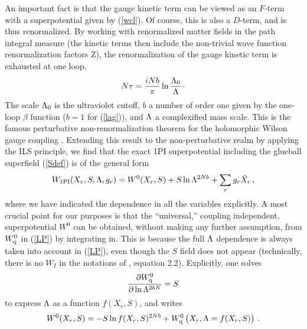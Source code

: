 \documentclass[a4paper,12pt]{article}
\begin{document}
An important fact is that the gauge kinetic term 
can be viewed as an $F$-term with a superpotential given by 
(\ref{wcl}). Of course, this is also a $D$-term, and is thus renormalized. 
By working with renormalized matter fields
in the path integral measure (the kinetic terms then include
the non-trivial wave function renormalization factors Z), the 
renormalization of the gauge kinetic term is exhausted at one loop,
%
\begin{equation}
\label{tauren}
N\tau = {iNb\over\pi}\ln {\Lambda_{0}\over\Lambda}\,\cdotp
\end{equation}
%
The scale $\Lambda_{0}$ is the ultraviolet cutoff, $b$ a number of order
one given by the one-loop $\beta$ function ($b=1$ for (\ref{lag})),
and $\Lambda$ a complexified mass scale. This is the famous perturbative
non-renormalization theorem for the holomorphic Wilson gauge coupling
\cite{SV}. Extending this result to the non-perturbative realm by
applying the ILS principle, we find that the exact 1PI superpotential
including the glueball superfield (\ref{Sdef}) is of the general form
%
\begin{equation}
\label{WeffS}
W_{\rm 1PI} (X_{r},S,\Lambda,g_{r}) = W^{0}(X_{r},S) + S\ln
\Lambda^{2Nb} + \sum_{r}g_{r}\tilde X_{r}\, ,
\end{equation}
%
where we have indicated the dependence in all the variables explicitly. A
most crucial point for our purposes
is that the ``universal,'' coupling independent,
superpotential $W^{0}$ can be obtained, without making any further
assumption, from $W_{\rm q}^{0}$ in (\ref{LP}) by integrating in. This is
because the full $\Lambda$ dependence is always taken into account in
(\ref{LP}), even though the $S$ field does not appear (technically,
there is no $W_{I}$ in the notations of \cite{ken}, equation 2.2).
Explicitly, one solves
%
\begin{equation}
\label{Seq}
{\partial W_{\rm q}^{0}\over\partial\ln\Lambda^{2bN}} = S
\end{equation}
%
to express $\Lambda$ as a function $f(X_{r},S)$, and writes
%
\begin{equation}
\label{W0}
W^{0}(X_{r},S) = -S\ln f(X_{r},S)^{2Nb} + 
W_{\rm q}^{0}\left(\strut X_{r},\Lambda = f(X_{r},S)\right)\, .
\end{equation}
%
\end{document}
